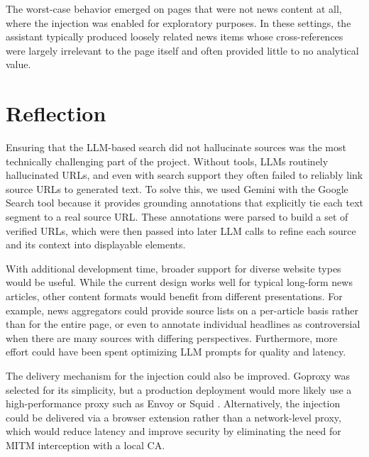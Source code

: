 \documentclass[11pt]{article}
\begin{document}
The worst-case behavior emerged on pages that were not news content at all, where the injection was enabled for exploratory purposes. In these settings, the assistant typically produced loosely related news items whose cross-references were largely irrelevant to the page itself and often provided little to no analytical value.

\section{Reflection}
Ensuring that the LLM-based search did not hallucinate sources was the most technically challenging part of the project. Without tools, LLMs routinely hallucinated URLs, and even with search support they often failed to reliably link source URLs to generated text. To solve this, we used Gemini with the Google Search tool because it provides grounding annotations that explicitly tie each text segment to a real source URL. These annotations were parsed to build a set of verified URLs, which were then passed into later LLM calls to refine each source and its context into displayable elements.

With additional development time, broader support for diverse website types would be useful. While the current design works well for typical long-form news articles, other content formats would benefit from different presentations. For example, news aggregators could provide source lists on a per-article basis rather than for the entire page, or even to annotate individual headlines as controversial when there are many sources with differing perspectives. Furthermore, more effort could have been spent optimizing LLM prompts for quality and latency.

The delivery mechanism for the injection could also be improved. Goproxy was selected for its simplicity, but a production deployment would more likely use a high-performance proxy such as Envoy \cite{envoy} or Squid \cite{squid}. Alternatively, the injection could be delivered via a browser extension \cite{webextensions} rather than a network-level proxy, which would reduce latency and improve security by eliminating the need for MITM interception with a local CA.

\newpage
\printbibliography

\newpage
\appendix
\end{document}
